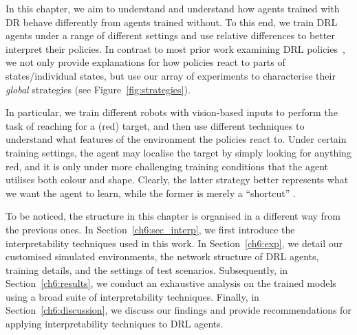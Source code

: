 In this chapter, we aim to understand  and understand how agents trained with DR behave differently from agents trained without. To this end, we train DRL agents under a range of different settings and use relative differences to better interpret their policies. In contrast to most prior work examining DRL policies~\cite{atrey2020exploratory,greydanus2018visualizing, olson2021counterfactual,puri2020explain,rupprecht2020finding,such2018atari,zahavy2016graying}, we not only provide explanations for how policies react to parts of states/individual states, but use our array of experiments to characterise their \emph{global} strategies (see Figure~\ref{fig:strategies}). 

In particular, we train different robots with vision-based inputs to perform the task of reaching for a (red) target, and then use different techniques to understand what features of the environment the policies react to. Under certain training settings, the agent may localise the target by simply looking for anything red, and it is only under more challenging training conditions that the agent utilises both colour and shape. Clearly, the latter strategy better represents what we want the agent to learn, while the former is merely a ``shortcut'' \cite{geirhos2020shortcut}.

To be noticed, the structure in this chapter is organised in a different way from the previous ones. In Section~\ref{ch6:sec_interp}, we first introduce the interpretability techniques used in this work. In Section~\ref{ch6:exp}, we detail our customised simulated environments, the network structure of DRL agents, training details, and the settings of test scenarios. Subsequently, in Section~\ref{ch6:results}, we conduct an exhaustive analysis on the trained models using a broad suite of interpretability techniques. Finally, in Section~\ref{ch6:discussion}, we discuss our findings and provide recommendations for applying interpretability techniques to DRL agents.

